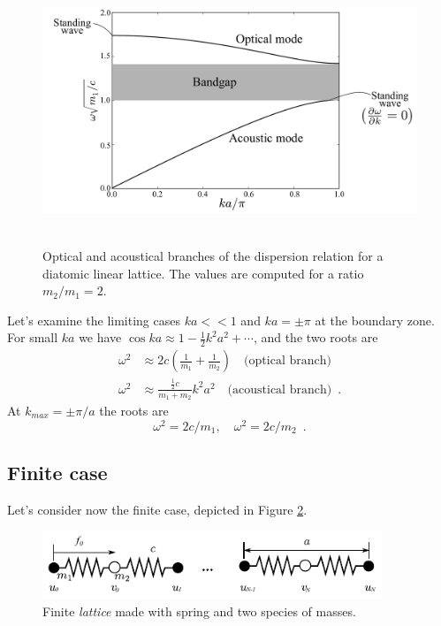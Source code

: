 \documentclass[11pt]{article}
\begin{document}
\begin{figure}[h]
\centering
\includegraphics[height=8cm]{img/diatomic-plot.pdf} 
\caption{Optical and acoustical branches of the dispersion relation for a diatomic linear lattice. The values are computed for a ratio $m_2/m_1 = 2$.}
\label{fig:diatomic_dispersion}
\end{figure}
Let's examine the limiting cases $ka<<1$ and $ka=\pm \pi$ at the boundary zone. For small $ka$ we have $\cos ka \approx 1 - \frac{1}{2}k^2a^2 + \cdots$, and the two roots are
\begin{align}
\omega^2 &\approx 2c\left(\frac{1}{m_1} + \frac{1}{m_2}\right)\quad \mbox{(optical branch)}\\
\omega^2 &\approx \frac{\frac{1}{2}c}{m_1+m_2}k^2a^2\quad \mbox{(acoustical branch)} \enspace  .
\end{align}
At $k_{max}=\pm\pi/a$ the roots are
\[\omega^2 = 2c/m_1,\quad \omega^2 = 2c/m_2 \enspace .\]

\subsection{Finite case}
Let's consider now the finite case, depicted in Figure \ref{fig:diatomic-finite}.
\begin{figure}[H]
\centering
\includegraphics[width=4in]{img/diatomic-finite.pdf} 
\caption{Finite \emph{lattice} made with spring and two species of masses.}
\label{fig:diatomic-finite}
\end{figure}
\end{document}
